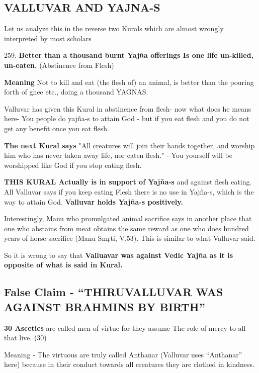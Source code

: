 \subsection*{VALLUVAR AND YAJNA-S}

Let us analyze this in the reverse two Kurals which are almost wrongly interpreted by most scholars

259. \textbf{Better than a thousand burnt Yajña offerings Is one life un-killed, un-eaten.} (Abstinence from Flesh)

\textbf{Meaning} Not to kill and eat (the flesh of) an animal, is better than the pouring forth of ghee etc., doing a thousand YAGNAS.

Valluvar has given this Kural in abstinence from flesh- now what does he means here- You people do yajña-s to attain God - but if you eat flesh and you do not get any benefit once you eat flesh.

\textbf{The next Kural says} "All creatures will join their hands together, and worship him who has never taken away life, nor eaten flesh." - You yourself will be worshipped like God if you stop eating flesh.

\textbf{THIS KURAL Actually is in support of Yajña-s} and against flesh eating. All Valluvar says if you keep eating Flesh there is no use in Yajña-s, which is the way to attain God. \textbf{Valluvar holds Yajña-s positively.}

Interestingly, Manu who promulgated animal sacrifice says in another place that one who abstains from meat obtains the same reward as one who does hundred years of horse-sacrifice (Manu Smŗti, V.53). This is similar to what Valluvar said.

So it is wrong to say that \textbf{Valluavar was against Vedic Yajña as it is opposite of what is said in Kural.}


\subsection*{False Claim - “THIRUVALLUVAR WAS AGAINST BRAHMINS BY BIRTH”}

\textbf{30 Ascetics} are called men of virtue for they assume The role of mercy to all that live. (30)

Meaning - The virtuous are truly called Anthanar (Valluvar uses “Anthanar” here) because in their conduct towards all creatures they are clothed in kindness.

